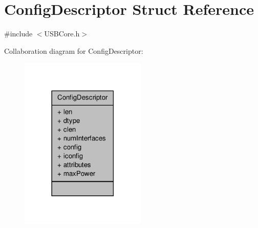 \hypertarget{struct_config_descriptor}{\section{Config\-Descriptor Struct Reference}
\label{struct_config_descriptor}
}


{\ttfamily \#include $<$U\-S\-B\-Core.\-h$>$}



Collaboration diagram for Config\-Descriptor\-:
\nopagebreak
\begin{figure}[H]
\begin{center}
\leavevmode
\includegraphics[width=170pt]{struct_config_descriptor__coll__graph}
\end{center}
\end{figure}
